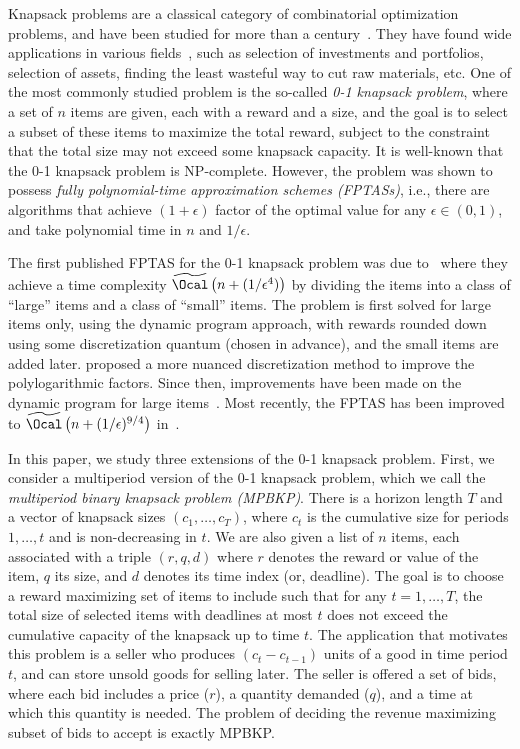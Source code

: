 \label{sec:typesetting-summary}
Knapsack problems are a classical category of combinatorial optimization problems, and have been studied for more than a century~\citep{mathews1896partition}. They have found wide applications in various fields~\citep{strusevich2005knapsack}, such as selection of investments and portfolios, selection of assets, finding the least wasteful way to cut raw materials, etc.
One of the most commonly studied problem is the so-called \emph{0-1 knapsack problem}, where a set of $n$ items are given, each with a reward and a size, and the goal is to select a subset of these items to maximize the total reward, subject to the constraint that the total size may not exceed some knapsack capacity. It is well-known that the 0-1 knapsack problem is NP-complete. However, the problem was shown to possess \emph{fully polynomial-time approximation schemes (FPTASs)}, i.e., there are algorithms that achieve $(1+\epsilon)$ factor of the optimal value for any $\epsilon\in (0,1)$, and take polynomial time in $n$ and $1/\epsilon$.

The first published FPTAS for the 0-1 knapsack problem was due to~\cite{ibarra1975fast} where they achieve a time complexity $\widetilde{\Ocal}\left(n+(1/\epsilon^4)\right)$ by dividing the items into a class of ``large'' items and a class of ``small'' items. The problem is first solved for large items only, using the dynamic program approach, with rewards rounded down using some discretization quantum (chosen in advance), and the small items are added later. \cite{lawler1979fast} proposed a more nuanced discretization method to improve the polylogarithmic factors. Since then, improvements have been made on the dynamic program for large items~\citep{kellerer2004improved,rhee2015faster}. Most recently, the FPTAS has been improved to $\widetilde{\Ocal}\left(n + (1/\epsilon)^{9/4}\right)$ in~\cite{jin:LIPIcs:2019:10652}.

In this paper, we study {  three} extensions of the 0-1 knapsack problem. First, we consider a multiperiod version of the 0-1 knapsack problem, which we call the \emph{multiperiod binary knapsack problem (MPBKP)}. 
There is a horizon length $T$ and a vector of knapsack sizes $(c_1,\ldots,c_T)$, where $c_t$ is the cumulative size for periods $1,\ldots,t$ and is non-decreasing in $t$. We are also given a list of $n$ items, each associated with a triple $(r, q, d)$ where $r$ denotes the reward or value of the item, $q$ its size, and $d$ denotes its time index (or, deadline).
The goal is to choose a reward maximizing set of items to include such that for any $t=1,\ldots,T$, the total size of selected items with deadlines at most $t$ does not exceed the cumulative capacity of the knapsack up to time $t$. The application that motivates this problem is a seller who produces $(c_t - c_{t-1})$ units of a good in time period $t$, and can store unsold goods for selling later. The seller is offered a set of bids, where each bid includes a price ($r$), a quantity demanded ($q$), and a time at which this quantity is needed. The problem of deciding the revenue maximizing subset of bids to accept is exactly MPBKP.

